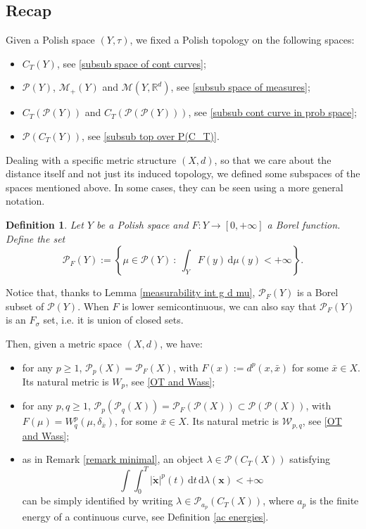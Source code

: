 \documentclass[10pt,leqno]{amsart}
\numberwithin{equation}{section}
\newtheorem{df}[teorema]{Definition}
\newcommand{\R}{\mathbb{R}}
\newcommand{\PP}{\mathcal{P}}
\renewcommand{\d}{\mathrm{d}}
\begin{document}
\subsection{Recap}\label{recap} 
Given a Polish space $(Y,\tau)$, we fixed a Polish topology on the following spaces:
\begin{itemize}
    \item[(i)] $C_T(Y)$, see \ref{subsub space of cont curves};
    \item[(ii)] $\PP(Y)$, $\mathcal{M}_+(Y)$ and $\mathcal{M}(Y,\R^d)$, see \ref{subsub space of measures};
    \item[(iii)] $C_T(\PP(Y))$ and $C_T(\PP(\PP(Y)))$, see \ref{subsub cont curve in prob space};
    \item[(iv)] $\PP(C_T(Y))$, see \ref{subsub top over P(C_T)}.
\end{itemize}




Dealing with a specific metric structure $(X,d)$, so that we care about the distance itself and not just its induced topology, we defined some subspaces of the spaces mentioned above. In some cases, they can be seen using a more general notation. 

\begin{df}\label{finite energies prob}
    Let $Y$ be a Polish space and $F:Y\to[0,+\infty] $ a Borel function. Define the set 
    \begin{equation}
        \mathcal{P}_F(Y):= \left\{\mu\in \PP(Y) \ : \ \int_Y F(y) \,\d\mu(y) <+\infty\right\}.
    \end{equation}
\end{df}

Notice that, thanks to Lemma \ref{measurability int g d mu}, $\PP_F(Y)$ is a Borel subset of $\PP(Y)$. When $F$ is lower semicontinuous, we can also say that $\PP_F(Y)$ is an $F_{\sigma}$ set, i.e. it is union of closed sets.

Then, given a metric space $(X,d)$, we have:
\begin{itemize}
    \item[(v)] for any $p\geq 1$, $\PP_p(X) = \PP_F(X)$, with $F(x) := d^{p}(x,\bar{x})$ for some $\bar{x}\in X$. Its natural metric is $W_p$, see \ref{OT and Wass};
    \item[(vi)] for any $p,q\geq 1$, $\PP_p(\PP_q(X)) = \PP_F(\PP(X))\subset \PP(\PP(X))$, with $F(\mu) = W_q^p(\mu,\delta_{\bar{x}})$, for some $\bar{x}\in X$. Its natural metric is $\mathcal{W}_{p,q}$, see \ref{OT and Wass};
    \item[(vii)] as in Remark \ref{remark minimal}, an object $\lambda \in \PP(C_T(X))$ satisfying 
    \[\int \int_0^T |\dot{\boldsymbol{x}}|^p(t) \,\d t \,\d\lambda(\boldsymbol{x})<+\infty\]
    can be simply identified by writing $\lambda \in \PP_{a_p}(C_T(X))$, where $a_p$ is the finite energy of a continuous curve, see Definition \ref{ac energies}.
\end{itemize}
\end{document}
